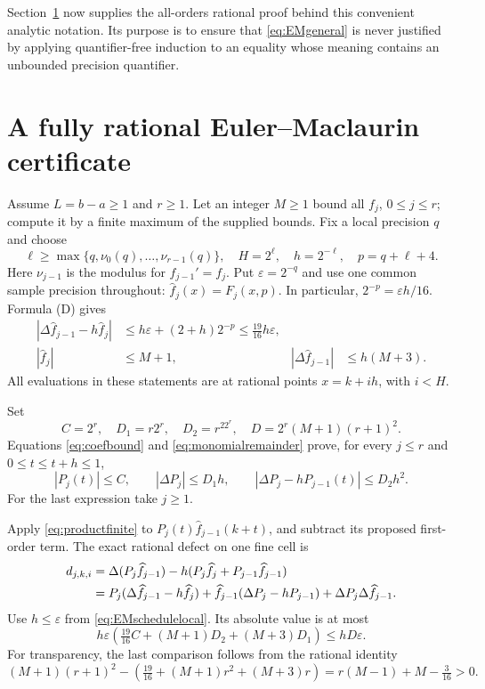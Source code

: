 \documentclass[11pt]{article}
\theoremstyle{definition}
\newcommand{\eps}{\varepsilon}
\newcommand{\abs}[1]{\left|#1\right|}
\begin{document}
Section~\ref{sec:finiteEM} now supplies the all-orders rational proof
behind this convenient analytic notation.  Its purpose is to ensure
that \eqref{eq:EMgeneral} is never justified by applying
quantifier-free induction to an equality whose meaning contains an
unbounded precision quantifier.

\section{A fully rational Euler--Maclaurin certificate}\label{sec:finiteEM}

Assume \(L=b-a\ge1\) and \(r\ge1\).  Let an integer \(M\ge1\)
bound all \(f_j\), \(0\le j\le r\); compute it by a finite maximum
of the supplied bounds.  Fix a local precision \(q\) and choose
\begin{equation}
 \ell\ge\max\{q,\nu_0(q),\ldots,\nu_{r-1}(q)\},
 \quad H=2^\ell,\quad h=2^{-\ell},\quad p=q+\ell+4.
 \label{eq:EMschedulelocal}
\end{equation}
Here \(\nu_{j-1}\) is the modulus for \(f_{j-1}'=f_j\).
Put \(\eps=2^{-q}\) and use one common sample precision throughout:
\(\widehat f_j(x)=F_j(x,p)\).  In particular,
\(2^{-p}=\eps h/16\).  Formula (D) gives
\begin{align}
 \abs{\Delta\widehat f_{j-1}-h\widehat f_j}
 &\le h\eps+(2+h)2^{-p}\le\tfrac{19}{16}h\eps,
 \label{eq:rationalderiv}\\
 \abs{\widehat f_j}&\le M+1,&
 \abs{\Delta\widehat f_{j-1}}&\le h(M+3).
 \label{eq:rationalincrement}
\end{align}
All evaluations in these statements are at rational points
\(x=k+ih\), with \(i<H\).

Set
\begin{equation}
 C=2^r,\quad D_1=r2^r,\quad D_2=r^22^r,\quad
 D=2^r(M+1)(r+1)^2.\label{eq:Dconstants}
\end{equation}
Equations \eqref{eq:coefbound} and \eqref{eq:monomialremainder}
prove, for every \(j\le r\) and \(0\le t\le t+h\le1\),
\begin{equation}
 \abs{P_j(t)}\le C,\qquad
 \abs{\Delta P_j}\le D_1h,\qquad
 \abs{\Delta P_j-hP_{j-1}(t)}\le D_2h^2.
 \label{eq:Pfinitebounds}
\end{equation}
For the last expression take \(j\ge1\).

Apply \eqref{eq:productfinite} to
\(P_j(t)\widehat f_{j-1}(k+t)\), and subtract its proposed first-order
term.  The exact rational defect on one fine cell is
\begin{align}
 d_{j,k,i}={}&\Delta(P_j\widehat f_{j-1})
  -h(P_j\widehat f_j+P_{j-1}\widehat f_{j-1})\notag\\
 ={}&P_j(\Delta\widehat f_{j-1}-h\widehat f_j)
 +\widehat f_{j-1}(\Delta P_j-hP_{j-1})
 +\Delta P_j\Delta\widehat f_{j-1}.\label{eq:localdefect}
\end{align}
Use \(h\le\eps\) from \eqref{eq:EMschedulelocal}.  Its absolute value
is at most
\[
 h\eps\left(\tfrac{19}{16}C+(M+1)D_2+(M+3)D_1\right)
 \le hD\eps.
\]
For transparency, the last comparison follows from the rational identity
\[
 (M+1)(r+1)^2-
 \left(\tfrac{19}{16}+(M+1)r^2+(M+3)r\right)
 =r(M-1)+M-\tfrac3{16}>0.
\]
\end{document}
